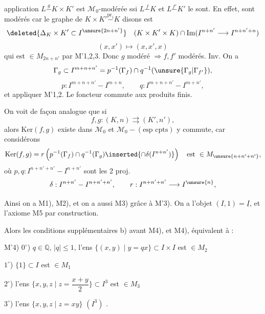 application $L\mathrel{\overset{g}{-}}K\times K'$ est $\mathcal M_0$-modérée ssi $L\mathrel{\overset{f}{-}}K$ et $L\mathrel{\overset{f'}{-}}K'$ le sont. En effet, 
sont modérés car le graphe de $K\times K'\mathrel{\overset{\mathrm{pr}_1}{-}}K$ disons est
\[
\deleted{\Delta_K\times K'\subset I^{\unsure{2n+n'}}}\quad
(K\times K'\times K)\cap
\mathrm{Im}(I^{n+n'}\longrightarrow I^{n+n'+n})
\]
\[
(x,x')\longmapsto(x,x',x)
\]
qui est $\in M_{2n+n'}$ par M'1,2,3. Donc $g$ modéré $\Rightarrow f,f'$ modérés.
Inv. On a
\[
\Gamma_g\subset I^{m+n+n'}
=p^{-1}(\Gamma_f)\cap q^{-1}(\unsure{\Gamma_g|\Gamma_{f'}}),
\]
\[
p:I^{m+n+n'}-I^{m+n},\qquad q:I^{m+n+n'}-I^{m+n'},
\]
et appliquer M'1,2. Le foncteur   commute aux produits finis.

On voit de façon analogue que si
\[
f,g:(K,n)\rightrightarrows(K',n'),
\]
alors $\mathrm{Ker}(f,g)$ existe dans $\mathcal M_0$ et $\mathcal M_0-(\text{esp cpts})$ y commute, car considérons
\[
\mathrm{Ker}(f,g)=r\left(p^{-1}(\Gamma_f)\cap q^{-1}(\Gamma_g)
\inserted{\cap\delta(I^{n+n'})}\right)
\quad\text{est }\in M_{\unsure{n+n'+n'}},
\]
où $p,q:I^{n+n'+n'}-I^{n+n'}$ sont les 2 proj.
\[
\delta:I^{n+n'}-I^{n+n'+n'},\qquad
r:I^{n+n'+n'}\longrightarrow I^{\unsure{n}},
\]



Ainsi on a M1), M2), et on a aussi M3) grâce à M'3). On a l'objet $(I,1)=\underline I$,  et l'axiome M5 par construction.

Alors les conditions supplémentaires b) avant M4), et M4), équivalent à :

M'4) $0^\circ$)  $q\in\mathbb Q$, $|q|\leq1$, l'ens
$\{(x,y)\mid y=qx\}\subset I\times I$ est $\in M_2$

$1^\circ$)  $\{1\}\subset I$ est $\in M_1$

$2^\circ$) l'ens $\{x,y,z\mid z=\dfrac{x+y}{2}\}\subset I^3$ est $\in M_3$

$3^\circ$) l'ens $\{x,y,z\mid z=xy\}$ $(I^3)$ \text{---}.

